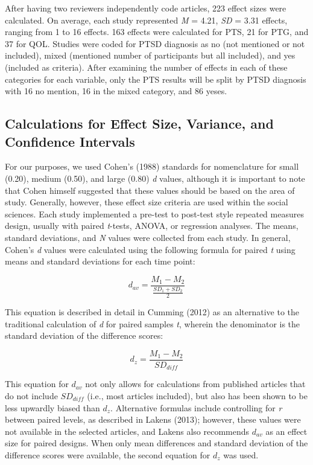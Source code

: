 \documentclass[man]{apa6}
\theoremstyle{definition}
\theoremstyle{definition}
\theoremstyle{definition}
\theoremstyle{remark}
\begin{document}
After having two reviewers independently code articles, 223 effect sizes
were calculated. On average, each study represented \emph{M} = 4.21,
\emph{SD} = 3.31 effects, ranging from 1 to 16 effects. 163 effects were
calculated for PTS, 21 for PTG, and 37 for QOL. Studies were coded for
PTSD diagnosis as no (not mentioned or not included), mixed (mentioned
number of participants but all included), and yes (included as
criteria). After examining the number of effects in each of these
categories for each variable, only the PTS results will be split by PTSD
diagnosis with 16 no mention, 16 in the mixed category, and 86 yeses.

\subsection{Calculations for Effect Size, Variance, and Confidence
Intervals}\label{calculations-for-effect-size-variance-and-confidence-intervals}

For our purposes, we used Cohen's (1988) standards for nomenclature for
small (0.20), medium (0.50), and large (0.80) \emph{d} values, although
it is important to note that Cohen himself suggested that these values
should be based on the area of study. Generally, however, these effect
size criteria are used within the social sciences. Each study
implemented a pre-test to post-test style repeated measures design,
usually with paired \emph{t}-tests, ANOVA, or regression analyses. The
means, standard deviations, and \emph{N} values were collected from each
study. In general, Cohen's \emph{d} values were calculated using the
following formula for paired \emph{t} using means and standard
deviations for each time point:

\[
{d_{av}} = \frac { M_1 - M_2 } { \frac { SD_1 + SD_2 } { 2 }}
\]

This equation is described in detail in Cumming (2012) as an alternative
to the traditional calculation of \emph{d} for paired samples \emph{t},
wherein the denominator is the standard deviation of the difference
scores:

\[
{d_{z}} = \frac { M_1 - M_2 } { SD_{diff} }
\]

This equation for \(d_{av}\) not only allows for calculations from
published articles that do not include \(SD_{diff}\) (i.e., most
articles included), but also has been shown to be less upwardly biased
than \(d_{z}\). Alternative formulas include controlling for \emph{r}
between paired levels, as described in Lakens (2013); however, these
values were not available in the selected articles, and Lakens also
recommends \(d_{av}\) as an effect size for paired designs. When only
mean differences and standard deviation of the difference scores were
available, the second equation for \(d_z\) was used.
\end{document}
